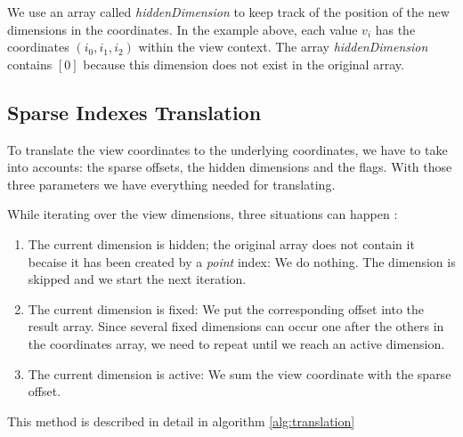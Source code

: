 We use an array called \textit{hiddenDimension} to keep track of the position of the new dimensions in the coordinates. In the example above, each value $v_{i}$ has the coordinates $(i_{0}, i_{1}, i_{2})$ within the view context. The array \textit{hiddenDimension} contains $[0]$ because this dimension does not exist in the original array.

\subsection{Sparse Indexes Translation}
\label{ssec:translation}

To translate the view coordinates to the underlying coordinates, we have to take into accounts: the sparse offsets, the hidden dimensions and the flags. With those three parameters we have everything needed for translating.



While iterating over the view dimensions, three situations can happen :
\begin{enumerate}
	\item The current dimension is hidden; the original array does not contain it becaise it has been created by a \textit{point} index: We do nothing. The dimension is skipped and we start the next iteration.
	\item The current dimension is fixed: We put the corresponding offset into the result array. Since several fixed dimensions can occur one after the others in the coordinates array, we need to repeat until we reach an active dimension.
	\item The current dimension is active: We sum the view coordinate with the sparse offset.
\end{enumerate}
This method is described in detail in algorithm \ref{alg:translation} 


